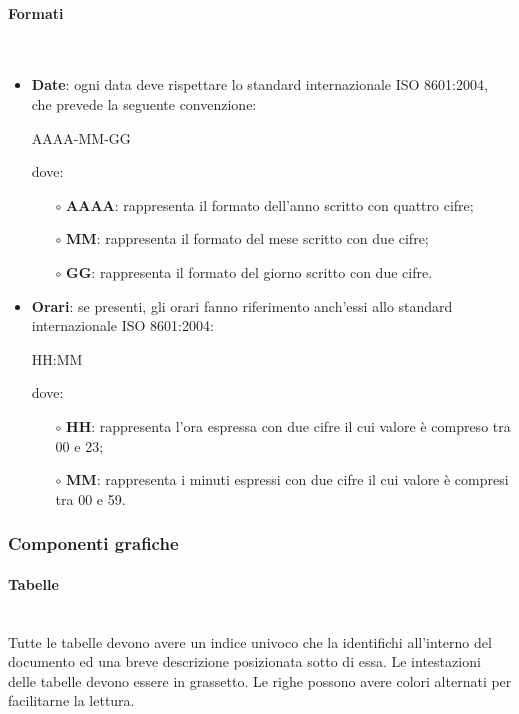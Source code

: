 \paragraph{Formati}\mbox{}\\ \label{sec:Formati}
\begin{itemize}
\item \textbf{Date}: ogni data deve rispettare lo standard internazionale ISO 8601:2004, che prevede la seguente convenzione:
\begin{center}
AAAA-MM-GG
\end{center}
dove: 
\begin{itemize}
\item[$\circ$] \textbf{AAAA}: rappresenta il formato dell'anno scritto con quattro cifre;
\item[$\circ$] \textbf{MM}: rappresenta il formato del mese scritto con due cifre;
\item[$\circ$] \textbf{GG}: rappresenta il formato del giorno scritto con due cifre.
\end{itemize}
\item \textbf{Orari}: se presenti, gli orari fanno riferimento anch'essi allo standard internazionale ISO 8601:2004:
\begin{center}
HH:MM
\end{center}
dove:
\begin{itemize}
\item[$\circ$] \textbf{HH}: rappresenta l'ora espressa con due cifre il cui valore è compreso tra 00 e 23;
\item[$\circ$] \textbf{MM}: rappresenta i minuti espressi con due cifre il cui valore è compresi tra 00 e 59.
\end{itemize}
\end{itemize}

\subsubsection{Componenti grafiche}

\paragraph{Tabelle}\mbox{}\\
Tutte le tabelle devono avere un indice univoco che la identifichi all’interno del documento ed una breve descrizione posizionata sotto di essa. Le intestazioni delle tabelle devono essere in grassetto.
Le righe possono avere colori alternati per facilitarne la lettura.
